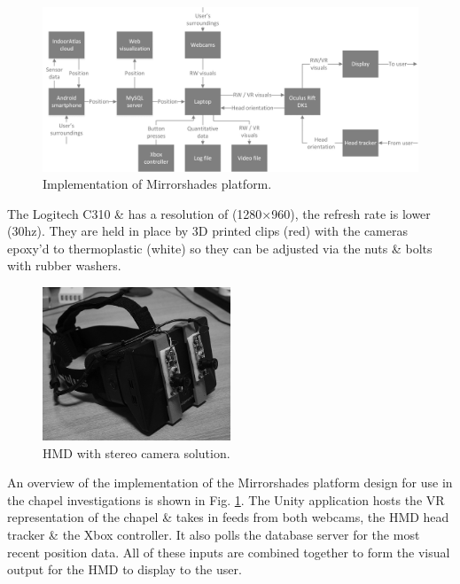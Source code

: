 \documentclass[conference]{acmsiggraph}
\begin{document}
\begin{figure}[h]
	\thispagestyle{empty}
	\begin{center}
		\includegraphics[width=\linewidth]{images/experimental-implementation.png}
		\caption{Implementation of Mirrorshades platform.}
		\label{experimentalimplementation}
	\end{center}
\end{figure}

The Logitech C310 \& has a resolution of (1280×960), the refresh rate is lower (30hz). They are held in place by 3D printed clips (red) with the cameras epoxy’d to thermoplastic (white) so they can be adjusted via the nuts \& bolts with rubber washers.

\begin{figure}[h]
	\begin{center}
		\includegraphics[width=0.5\textwidth]{images/rift.png}
		\caption{HMD with stereo camera solution.}
		\label{rift}
	\end{center}
\end{figure}
An overview of the implementation of the Mirrorshades platform design for use in the chapel investigations is shown in Fig. \ref{experimentalimplementation}. The Unity application hosts the VR representation of the chapel \& takes in feeds from both webcams, the HMD head tracker \& the Xbox controller. It also polls the database server for the most recent position data. All of these inputs are combined together to form the visual output for the HMD to display to the user.
\end{document}
